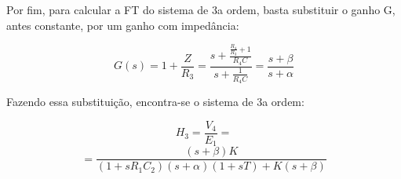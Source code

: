 Por fim, para calcular a FT do sistema de 3a ordem, basta substituir o ganho G, antes constante, por um ganho com impedância:

\begin{equation}
G(s)=1+\frac{Z}{R_3}=\frac{s+\frac{\frac{R_4}{R_3}+1}{R_4C}}{s+\frac{1}{R_4C}}=\frac{s+\beta}{s+\alpha}
\end{equation}

Fazendo essa substituição, encontra-se o sistema de 3a ordem:

\begin{equation}
H_3=\frac{V_4}{E_1}=
\end{equation}
\begin{equation}
=\frac{(s+\beta)K}{(1+sR_1C_2)(s+\alpha)(1+sT)+K(s+\beta)}
\end{equation}












